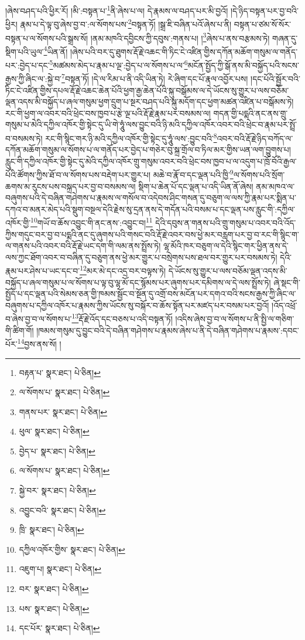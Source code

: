 །ཞེས་བཤད་པའི་ཕྱིར་རོ། །མི་:བསྟན་པ་\footnote{བརྟན་པ་  སྣར་ཐང་།  པེ་ཅིན། }ནི་ཞེས་པ་ལ། དེ་རྣམས་ལ་བཤད་པར་མི་བྱའོ། །དེ་ཉིད་བསྟན་པར་བྱ་བའི་ཕྱིར། རྣམ་པ་དེ་ལྟ་བུ་ཞེས་བྱ་བ་:ལ་སོགས་པས་\footnote{ལ་སོགས་པ་  སྣར་ཐང་།  པེ་ཅིན། }བསྟན་ཏོ། །སྒྲ་ཇི་བཞིན་པའོ་ཞེས་པ་ནི། བསྟན་པ་ཙམ་སོ་སོར་བསྟན་པ་ལ་སོགས་པའི་སྒྲས་སོ། །ནམ་མཁའི་དབྱིངས་ཀྱི་དབུས་:གནས་པ། །\footnote{གནས་པར་  སྣར་ཐང་།  པེ་ཅིན། }ཞེས་པ་ནས་བརྩམས་ཏེ། གཞན་དུ་སྡིག་པའི་ཡུལ་\footnote{ཕུལ་  སྣར་ཐང་།  པེ་ཅིན། }ཡིན་ནོ། །ཞེས་པའི་བར་དུ་ཐུགས་རྡོ་རྗེ་འཆང་གི་ཏིང་ངེ་འཛིན་གྱིས་དཀོན་མཆོག་གསུམ་ལ་གནོད་པར་:བྱེད་པ་དང་\footnote{བྱེད་པ་  སྣར་ཐང་།  པེ་ཅིན། }མཚམས་མེད་པ་རྣམ་པ་ལྔ་:བྱེད་པ་ལ་སོགས་པ་ལ་\footnote{ལ་སོགས་པ་  སྣར་ཐང་།  པེ་ཅིན། }མངོན་སྤྱོད་ཀྱི་སྒོ་ནས་མི་བསྐྱོད་པའི་སངས་རྒྱས་ཀྱི་ཞིང་ལ་:སྐྱེ་བ་\footnote{སྐྱེ་བར་  སྣར་ཐང་།  པེ་ཅིན། }བསྟན་ཏོ། །དེ་ལ་རིམ་པ་ནི་འདི་ཡིན་ཏེ། རེ་ཞིག་དང་པོ་རྣལ་འབྱོར་པས། །དང་པོའི་སྦྱོར་བའི་ཏིང་ངེ་འཛིན་གྱིས་དཔལ་རྡོ་རྗེ་འཆང་ཆེན་པོའི་ཕྱག་རྒྱ་ཆེན་པོའི་སྐུ་བསྒོམས་ལ་དེ་ཡོངས་སུ་གྱུར་པ་ལས་བཅོམ་ལྡན་འདས་མི་བསྐྱོད་པ་ཞལ་གསུམ་ཕྱག་དྲུག་པ་སྔར་བཤད་པའི་སྐུ་མདོག་དང་ཕྱག་མཚན་འཛིན་པ་བསྒོམས་ཏེ། རང་གི་ཕྱག་ལ་འབར་བའི་ཕྲེང་བས་ཁྱབ་པ་རྩེ་ལྔ་པའི་རྡོ་རྗེ་རྣམ་པར་བསམས་ལ། གདན་གྱི་པདྨའི་ནང་ནས་གྲུ་གསུམ་པ་མེའི་དཀྱིལ་འཁོར་གྱི་སྟེང་དུ་ཡི་གེ་ཧཱུཾ་ལས་བྱུང་བའི་ཉི་མའི་དཀྱིལ་འཁོར་འབར་བའི་ཕྲེང་བ་རྣམ་པར་སྤྲོ་བ་བསམས་ཏེ། རང་གི་སྙིང་གར་ཉི་མའི་དཀྱིལ་འཁོར་གྱི་སྟེང་དུ་ཧཱུཾ་ལས་:བྱུང་བའི་\footnote{འབྱུང་བའི་  སྣར་ཐང་།  པེ་ཅིན། }འབར་བའི་རྡོ་རྗེ་ཉིད་བཀོད་ལ་དཀོན་མཆོག་གསུམ་ལ་སོགས་པ་ལ་གནོད་པར་བྱེད་པ་གཅེར་བུ་སྐྲ་གྲོལ་བ་ཏིལ་མར་གྱིས་ཡན་ལག་བྱུགས་པ། རླུང་གི་དཀྱིལ་འཁོར་གྱི་སྟེང་དུ་མེའི་དཀྱིལ་འཁོར་གྲུ་གསུམ་འབར་བའི་ཕྲེང་བས་ཁྱབ་པ་ལ་འདུག་པ་ཁྲོ་བོའི་རྒྱལ་པོའི་ཚོགས་ཀྱིས་ཐོ་བ་ལ་སོགས་པས་བརྡེག་པར་གྱུར་པ། མཆེ་བ་རྣོ་བ་དང་ལྡན་པའི་ཁྱི་\footnote{ཁྲི་  སྣར་ཐང་།  པེ་ཅིན། }ལ་སོགས་པའི་སྲོག་ཆགས་མ་རུངས་པས་བསྐྲད་པར་བྱ་བ་བསམས་ལ། སྡིག་པ་ཆེན་པོ་དང་ལྡན་པ་འདི་ཡིན་ནོ་ཞེས། ནམ་མཁའ་ལ་བཞུགས་པའི་དེ་བཞིན་གཤེགས་པ་རྣམས་ལ་གསོལ་བ་འདེབས་ཤིང་གསན་དུ་བཅུག་ལ་ལས་ཀྱི་རྣམ་པར་སྨིན་པ་དཀའ་བ་མནར་མེད་པའི་སྡུག་བསྔལ་དེའི་རྗེས་སུ་དྲན་ནས་དེ་གདོན་པའི་བསམ་པ་དང་ལྡན་པས་རླུང་གི་:དཀྱིལ་འཁོར་གྱི་\footnote{དཀྱིལ་འཁོར་གྱིས་  སྣར་ཐང་།  པེ་ཅིན། }གཡོ་བ་ཆོས་འབྱུང་གི་ནང་ནས་:འབྱུང་བ།\footnote{འཇུག་པ།  སྣར་ཐང་།  པེ་ཅིན། } དེའི་དབུས་ན་གནས་པའི་གྲུ་གསུམ་པ་འབར་བའི་འོད་ཀྱིས་གདུང་བར་བྱ་བ་པདྨའི་ནང་དུ་ཞུགས་པའི་གསང་བའི་རྡོ་རྗེ་འབར་བས་ཕྱེ་མར་བརླག་པར་བྱ་བ་རང་གི་སྙིང་ག་ལ་གནས་པའི་འབར་བའི་རྡོ་རྗེ་ཡང་དག་གི་ལམ་ནས་སྤྲོས་ཏེ། ལྷ་མོའི་ཁར་བཅུག་ལ་དེའི་སྙིང་གར་ཕྱིན་ནས་དེ་ལས་ཀྱང་ཐོག་འབར་བ་བཞིན་དུ་བཅུག་ནས་ཕྱེ་མར་གྱུར་པ་བསྲེགས་པས་ཐལ་བར་གྱུར་པར་བསམས་ཏེ། དེའི་རྣམ་པར་ཤེས་པ་ཡང་དང་བ་\footnote{བར་  སྣར་ཐང་།  པེ་ཅིན། }མར་མེ་དང་འདྲ་བར་བལྟས་ཏེ། དེ་ཡོངས་སུ་གྱུར་པ་ལས་བཅོམ་ལྡན་འདས་མི་བསྐྱོད་པ་ཞལ་གསུམ་པ་ལ་སོགས་པ་ལྟ་བུ་ལྷ་མོ་དང་སྙོམས་པར་ཞུགས་པར་དམིགས་ལ་དེ་ལས་སྤྲོས་ཏེ། ཞེ་སྡང་གི་སྤྱོད་པ་དང་ལྡན་པའི་སེམས་ཅན་གྱི་ཁམས་སྦྱོང་བ་སྔོན་དུ་འགྲོ་བས་མངོན་པར་དགའ་བའི་སངས་རྒྱས་ཀྱི་ཞིང་ལ་བཞུགས་པ་དཀྱིལ་འཁོར་པ་རྣམས་ཀྱིས་ཡོངས་སུ་བསྐོར་བ་ཆོས་སྟོན་པར་མཛད་པར་བསམ་པར་བྱའོ། །འོད་འཕྲོ་བ་ཞེས་བྱ་བ་ལ་སོགས་པ་\footnote{པས་  སྣར་ཐང་།  པེ་ཅིན། }རྡོ་རྗེ་འོད་དང་བཅས་པ་འདི་བསྟན་ཏོ། །འདིས་ཞེས་བྱ་བ་ལ་སོགས་པ་ནི་སྤྱི་ལ་གཅིག་གི་ཚིག་གོ། །ཁམས་གསུམ་དུ་བྱུང་བའི་དེ་བཞིན་གཤེགས་པ་རྣམས་ཞེས་པ་ནི་དེ་བཞིན་གཤེགས་པ་རྣམས་:དབང་པོར་\footnote{དང་པོར་  སྣར་ཐང་།  པེ་ཅིན། }བྱས་ནས་སོ། །
